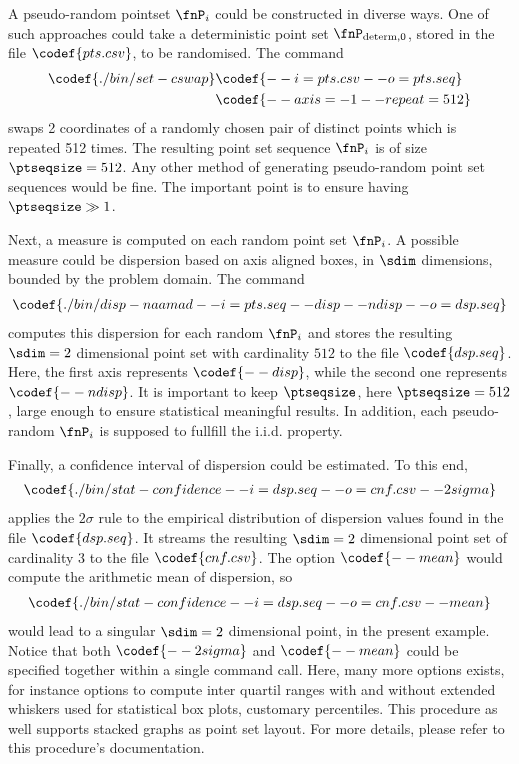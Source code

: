 %
A pseudo-random pointset $\fnP_i$ could be constructed in diverse ways. One of such approaches could take a deterministic point set $\fnP_{\text{determ},0}$, stored in the file $\codef{pts.csv}$, to be randomised. The command
\begin{align*}
  \codef{./bin/set-cswap }&\codef{--i=pts.csv --o=pts.seq}\\
  &\codef{--axis=-1 --repeat=512}
\end{align*}
swaps 2 coordinates of a randomly chosen pair of distinct points which is repeated 512 times. The resulting point set sequence $\fnP_i$ is of size $\ptseqsize=512$. Any other method of generating pseudo-random point set sequences would be fine. The important point is to ensure having $\ptseqsize \gg 1$.

Next, a measure is computed on each random point set $\fnP_i$. A possible measure could be dispersion based on axis aligned boxes, in $\sdim$ dimensions, bounded by the problem domain. The command
\begin{align*}
  \codef{./bin/disp-naamad --i=pts.seq --disp --ndisp --o=dsp.seq}
\end{align*}
computes this dispersion for each random $\fnP_i$ and stores the resulting $\sdim=2$ dimensional point set with cardinality $512$ to the file $\codef{dsp.seq}$. Here, the first axis represents $\codef{--disp}$, while the second one represents $\codef{--ndisp}$. It is important to keep $\ptseqsize$, here $\ptseqsize=512$, large enough to ensure statistical meaningful results. In addition, each pseudo-random $\fnP_i$ is supposed to fullfill the i.i.d. property.

Finally, a confidence interval of dispersion could be estimated. To this end,
\begin{align*}
  \codef{./bin/stat-confidence --i=dsp.seq --o=cnf.csv --2sigma}
\end{align*}
applies the $2\sigma$ rule to the empirical distribution of dispersion values found in the file $\codef{dsp.seq}$. It streams the resulting $\sdim=2$ dimensional point set of cardinality 3 to the file $\codef{cnf.csv}$. The option $\codef{--mean}$ would compute the arithmetic mean of dispersion, so
\begin{align*}
  \codef{./bin/stat-confidence --i=dsp.seq --o=cnf.csv --mean}
\end{align*}
would lead to a singular $\sdim=2$ dimensional point, in the present example. Notice that both $\codef{--2sigma}$ and $\codef{--mean}$ could be specified together within a single command call. Here, many more options exists, for instance options to compute inter quartil ranges with and without extended whiskers used for statistical box plots, customary percentiles. This procedure as well supports stacked graphs as point set layout. For more details, please refer to this procedure's documentation.
